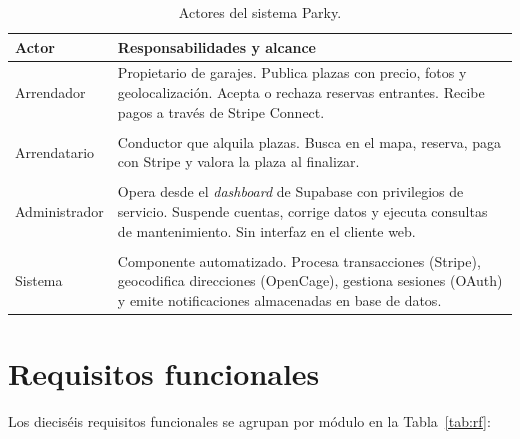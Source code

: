\begin{table}[htbp]
\centering
\caption{Actores del sistema Parky.}
\label{tab:actores-principales}
\begin{tabularx}{\textwidth}{lX}
\toprule
\textbf{Actor} & \textbf{Responsabilidades y alcance} \\
\midrule
\rowcolor{gray!5}
Arrendador    & Propietario de garajes. Publica plazas con precio, fotos y geolocalización. Acepta o rechaza reservas entrantes. Recibe pagos a través de Stripe Connect. \\
\\
Arrendatario  & Conductor que alquila plazas. Busca en el mapa, reserva, paga con Stripe y valora la plaza al finalizar. \\
\\
\rowcolor{gray!5}
Administrador & Opera desde el \textit{dashboard} de Supabase con privilegios de servicio. Suspende cuentas, corrige datos y ejecuta consultas de mantenimiento. Sin interfaz en el cliente web. \\
\\
Sistema       & Componente automatizado. Procesa transacciones (Stripe), geocodifica direcciones (OpenCage), gestiona sesiones (OAuth) y emite notificaciones almacenadas en base de datos. \\
\bottomrule
\end{tabularx}
\end{table}

\section{Requisitos funcionales}
\label{sec:requisitos_funcionales}

Los dieciséis requisitos funcionales se agrupan por módulo en la Tabla~\ref{tab:rf}:

